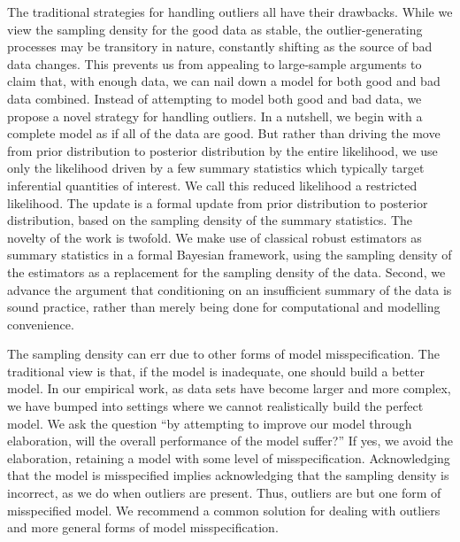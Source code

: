 \documentclass[12pt]{article}
\newcommand{\red}[1]{{\color{red}#1}}
\newcommand{\green}[1]{{\color{green}#1}}
\begin{document}
The traditional strategies for handling outliers all have their drawbacks.  While we view the sampling 
density for the good data as stable, the outlier-generating processes 
may be transitory in nature, constantly shifting as the source of bad data changes.  This prevents
us from appealing to large-sample arguments to claim that, with enough data, we can nail down a
model for both good and bad data combined.  Instead of attempting to model both good and bad
data, we propose a novel strategy for handling outliers. %
In a nutshell, we begin with a complete model   
as if all of the data are good.
But rather than driving the move from prior distribution to posterior
distribution by the entire likelihood, we use only the likelihood
driven by a
few summary statistics which typically target inferential quantities
of interest.  We call this reduced likelihood a restricted %
likelihood. 
The 
update is a formal update from prior distribution to posterior distribution, based on the sampling density
of the summary statistics. 
The novelty of the work is twofold.  We make use of
classical robust estimators as  summary statistics in a formal
Bayesian framework, using the sampling density of the estimators as a replacement for the 
sampling density of the data.  Second, we advance the argument that conditioning on an insufficient
summary of the data is sound practice, rather than merely being done for computational and 
modelling convenience.  

\green{ The sampling density can err due to other forms of model misspecification.  
The traditional view is that, if the model is inadequate, one should build a better model.  In our
empirical work, as data sets have become larger and more complex, we have bumped into 
settings where we cannot realistically build the perfect model.  We ask the question ``by attempting
to improve our model through elaboration, will the overall performance of the model suffer?''  If yes,
we avoid the elaboration, retaining a model with some level of misspecification.  Acknowledging that
the model is misspecified implies acknowledging that the sampling density is incorrect, as
we do when outliers are present.  Thus, outliers are but one form of misspecified model.  
We recommend a common solution for dealing with outliers and more general forms of model misspecification.}  
\end{document}
